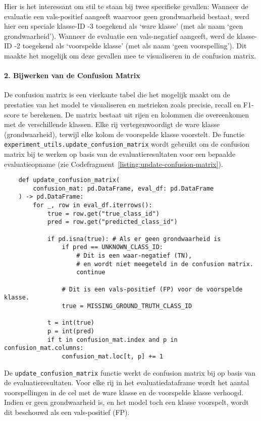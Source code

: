 Hier is het interessant om stil te staan bij twee specifieke gevallen:
Wanneer de evaluatie een vals-positief aangeeft waarvoor geen grondwaarheid bestaat, werd hier een speciale klasse-ID -3 toegekend als `ware klasse' (met als naam `geen grondwaarheid').
Wanneer de evaluatie een vals-negatief aangeeft, werd de klasse-ID -2 toegekend als `voorspelde klasse' (met als naam `geen voorspelling').
Dit maakte het mogelijk om deze gevallen mee te visualiseren in de confusion matrix.

\paragraph{2. Bijwerken van de Confusion Matrix}
De confusion matrix is een vierkante tabel die het mogelijk maakt om de prestaties van het model te visualiseren en metrieken zoals precisie, recall en F1-score te berekenen.
De matrix bestaat uit rijen en kolommen die overeenkomen met de verschillende klassen.
Elke rij vertegenwoordigt de ware klasse (grondwaarheid), terwijl elke kolom de voorspelde klasse voorstelt.
De functie \texttt{experiment\_utils.update\_confusion\_matrix} wordt gebruikt om de confusion matrix bij 
te werken op basis van de evaluatieresultaten voor een bepaalde evaluatieopname (zie Codefragment~\ref{listing:update-confusion-matrix}).

\begin{listing}[H]
  \begin{verbatim}
    def update_confusion_matrix(
        confusion_mat: pd.DataFrame, eval_df: pd.DataFrame
    ) -> pd.DataFrame:
        for _, row in eval_df.iterrows():
            true = row.get("true_class_id")
            pred = row.get("predicted_class_id")

            if pd.isna(true): # Als er geen grondwaarheid is
                if pred == UNKNOWN_CLASS_ID:
                    # Dit is een waar-negatief (TN), 
                    # en wordt niet meegeteld in de confusion matrix.
                    continue

                # Dit is een vals-positief (FP) voor de voorspelde klasse.
                true = MISSING_GROUND_TRUTH_CLASS_ID

            t = int(true)
            p = int(pred)
            if t in confusion_mat.index and p in confusion_mat.columns:
                confusion_mat.loc[t, p] += 1
  \end{verbatim}
  \caption[Functie voor het bijwerken van de confusion matrix]{
      \label{listing:update-confusion-matrix}
        De \texttt{update\_confusion\_matrix} functie werkt de confusion matrix bij op basis van de evaluatieresultaten.
        Voor elke rij in het evaluatiedataframe wordt het aantal voorspellingen in de cel met de ware klasse en de voorspelde klasse verhoogd.
        Indien er geen grondwaarheid is, en het model toch een klasse voorspelt, wordt dit beschouwd als een vals-positief (FP).
      }
\end{listing}

